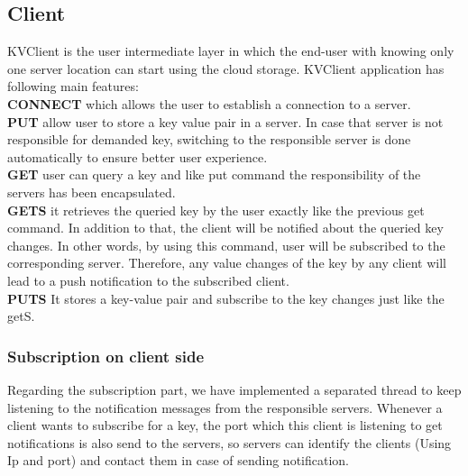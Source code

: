 \documentclass{sig-alternate}
\begin{document}
\subsection{Client}
KVClient is the user intermediate layer in which the end-user with knowing only one server location can start using the cloud storage. KVClient application has following main features: \\
\textbf{CONNECT} which allows the user to establish a connection to a server.\\
\textbf{PUT} allow user to store a key value pair in a server. In case that server is not responsible for demanded key, switching to the responsible server is done automatically to ensure better user experience.\\
\textbf{GET} user can query a key and like put command the responsibility of the servers has been encapsulated.\\
\textbf{GETS} it retrieves the queried key by the user exactly like the previous get command. In addition to that, the client will be notified about the queried  key changes. In other words, by using this command, user will be subscribed to the corresponding server. Therefore, any value changes of the key by any client will lead to a push notification to the subscribed client.\\
\textbf{PUTS} It stores a key-value pair and subscribe to the key changes just like the getS.\\
\subsubsection{Subscription on client side}
Regarding the subscription part, we have implemented a separated thread to keep listening to the notification messages from the responsible servers. Whenever a client wants to subscribe for a key, the port which this client is listening to get notifications is also send to the servers, so servers can identify the clients (Using Ip and port) and contact them in case of sending notification. %
\end{document}
